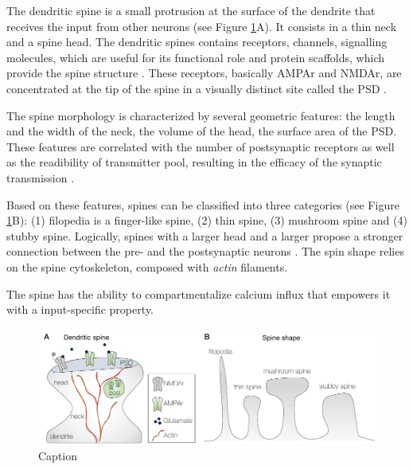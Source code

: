 The dendritic spine is a small protrusion at the surface of the dendrite that receives the input from other neurons (see Figure \ref{fig:SP_spine}A). It consists in a thin neck and a spine head. The dendritic spines contains receptors, channels, signalling molecules, which are useful for its functional role and protein scaffolds, which provide the spine structure \citep{bozelos_impact_2017}. These receptors, basically \acrshort{AMPAr} and \acrshort{NMDAr}, are concentrated at the tip of the spine in a visually distinct site called the \acrfull{PSD} \citep{bonilla-quintana_can_2022}.

The spine morphology is characterized by several geometric features: the length and the width of the neck, the volume of the head, the surface area of the \acrshort{PSD}. These features are correlated with the number of postsynaptic receptors as well as the readibility of transmitter pool, resulting in the efficacy of the synaptic transmission  \citep{Borczyk_neuronal_2019}.

Based on these features, spines can be classified into three categories (see Figure \ref{fig:SP_spine}B): (1) filopedia is a finger-like spine, (2) thin spine, (3) mushroom spine and (4) stubby spine. Logically, spines with a larger head and a larger propose a stronger connection between the pre- and the postsynaptic neurons \citep{bonilla-quintana_can_2022, lamprecht_structural_2004}. The spin shape relies on the spine cytoskeleton, composed with \textit{actin} filaments.  

The spine has the ability to compartmentalize calcium influx that empowers it with a input-specific property. \\

\begin{figure}[h!]
    \centering
    \includegraphics[scale=0.9]{latex/fig/Intro/SP_Spine.pdf}
    \caption{Caption}
    \label{fig:SP_spine}
\end{figure}



